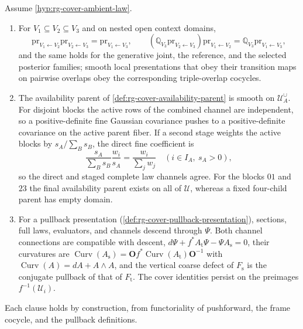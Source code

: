 Assume \cref{hyp:rg-cover-ambient-law}.
\begin{enumerate}
\item[(a)] For \(V_1\subseteq V_2\subseteq V_3\) and on nested open context domains,
\begin{equation}
 \mathrm{pr}_{V_1\leftarrow V_2}\mathrm{pr}_{V_2\leftarrow V_3}=\mathrm{pr}_{V_1\leftarrow V_3},
 \qquad
 (\mathbb Q_{V_3}\mathrm{pr}_{V_2\leftarrow V_3})\mathrm{pr}_{V_1\leftarrow V_2}
 =\mathbb Q_{V_3}\mathrm{pr}_{V_1\leftarrow V_3},
\label{eq:rg-cover-restriction-law}
\end{equation}
and the same holds for the generative joint, the reference, and the selected
posterior families; smooth local presentations that obey their transition maps
on pairwise overlaps obey the corresponding triple-overlap cocycles.
\item[(b)]\label{thm:rg-cover-parent-gluing} The availability parent of
\cref{def:rg-cover-availability-parent} is smooth on \(\mathcal U_A^{\cup}\). For
disjoint blocks the active rows of the combined channel are independent, so a
positive-definite fine Gaussian covariance pushes to a positive-definite
covariance on the active parent fiber. If a second stage weights the active
blocks by \(s_A/\sum_Bs_B\), the direct fine coefficient is
\begin{equation}
 \frac{s_A}{\sum_Bs_B}\frac{w_i}{s_A}
 =\frac{w_i}{\sum_jw_j}\quad(i\in I_A,\ s_A>0),
\label{eq:rg-cover-staged-weights}
\end{equation}
so the direct and staged complete law channels agree. For the blocks \(01\) and
\(23\) the final availability parent exists on all of \(\mathcal U\), whereas a
fixed four-child parent has empty domain.
\item[(c)]\label{thm:rg-cover-base-descent} For a pullback presentation
(\cref{def:rg-cover-pullback-presentation}), sections, full laws, evaluators, and
channels descend through \(\Psi\). Both channel connections are compatible with
descent, \(d\Psi+f^*A_{\mathrm t}\Psi-\Psi A_{\mathrm s}=0\), their curvatures
are \(\operatorname{Curv}(A_{\mathrm s})=\mathbf Of^*\operatorname{Curv}(A_{\mathrm t})\mathbf O^{-1}\)
with \(\operatorname{Curv}(A)=dA+A\wedge A\), and the vertical coarse defect of
\(F_{\mathrm s}\) is the conjugate pullback of that of \(F_{\mathrm t}\). The cover
identities persist on the preimages \(f^{-1}(\mathcal U_i)\).
\end{enumerate}
Each clause holds by construction, from functoriality of pushforward, the frame
cocycle, and the pullback definitions. 

